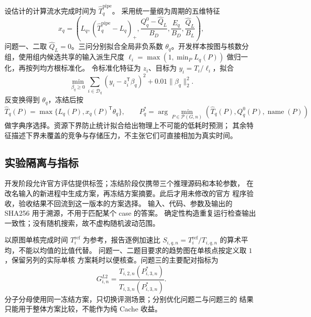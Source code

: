 设估计的计算流水完成时间为 $\widehat T_q^{\mathrm{pipe}}$。
采用统一量纲为周期的五维特征
\begin{equation}
 x_q=\left(L_q,(\widehat T_q^{\mathrm{pipe}}-L_q)_+,
 \frac{Q_q^0-\widehat Q_L}{B_D},\frac{E_q}{B_D},
 \frac{\widehat Q_L}{B_L}\right),
 \label{eq:fresh-features}
\end{equation}
问题一、二取 $\widehat Q_L=0$。三问分别拟合全局非负系数
$\theta_q$。开发样本按图与核数分组，使用组内候选共享的输入派生尺度
$\ell_i=\max(1,\min_{P} L_q(P))$ 做归一化，再按列均方根标准化。
令标准化特征为 $z_i$、目标为 $y_i=T_i/\ell_i$，拟合
\begin{equation}
 \min_{\beta_q\ge0}\sum_{i\in\mathcal D_q}(y_i-z_i^\mathsf T\beta_q)^2
             +0.01\|\beta_q\|_2^2.
\end{equation}
反变换得到 $\theta_q$，冻结后按
\begin{equation}
 \widehat T_q(P)=\max\{L_q(P),x_q(P)^\mathsf T\theta_q\},\qquad
 P_q^*=\arg\min_{P\in\mathcal P(G,n)}
       (\widehat T_q(P),Q_q^0(P),\operatorname{name}(P))
 \label{eq:fresh-selection}
\end{equation}
做字典序选择。资源下界防止统计拟合给出物理上不可能的低耗时预测；
其余特征描述下界未覆盖的竞争与存储压力，不主张它们可直接相加为真实时间。

\subsection{实验隔离与指标}
开发阶段允许官方评估提供标签；冻结阶段仅携带三个推理源码和本轮参数，
在改名输入的新进程中生成方案，再冻结方案摘要。此后才用未修改的官方
程序验收，验收结果不回流到这一版本的方案选择。
输入、代码、参数及输出的 SHA256 用于溯源，不用于匹配某个 case 的答案。
确定性构造重复运行检查输出一致性；没有随机搜索，故不虚构随机波动范围。

以原图单核完成时间 $T_i^{\mathrm{ref}}$ 为参考，报告逐例加速比
$S_{i,q,n}=T_i^{\mathrm{ref}}/T_{i,q,n}$ 的算术平均，不能以均值的比值代替。
问题一、二题目要求的趋势图在单核点按定义取 $1$，保留另列的实际单核
方案耗时以便核查。问题三的主要配对指标为
\begin{equation}
 G_{i,n}^{L2}=\frac{T_{i,2,n}(P_{i,3,n}^*)}{T_{i,3,n}(P_{i,3,n}^*)}.
\end{equation}
分子分母使用同一冻结方案，只切换评测场景；分别优化问题二与问题三的
结果只能用于整体方案比较，不能作为纯 Cache 收益。
